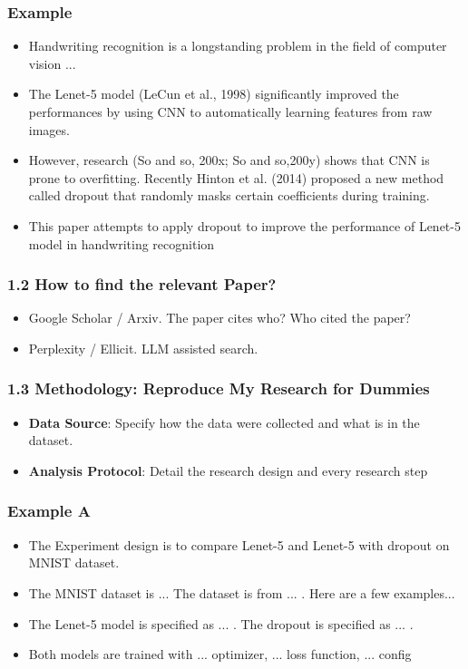 \documentclass{beamer}
\begin{document}
      \begin{frame}
      \frametitle{Example}
      \begin{itemize}[<+->]
          \item Handwriting recognition is a longstanding problem in the field of computer vision ...
          \item The Lenet-5 model (LeCun et al., 1998) significantly improved the performances by using CNN to automatically learning features from raw images.
          \item However, research (So and so, 200x; So and so,200y) shows that CNN is prone to overfitting. Recently Hinton et al. (2014) proposed a new method called dropout that randomly masks certain coefficients during training.
          \item This paper attempts to apply dropout to improve the performance of Lenet-5 model in handwriting recognition
      \end{itemize}
      \end{frame}
  
      \begin{frame}
      \frametitle{1.2 How to find the relevant Paper?}
      \begin{itemize}
          \item Google Scholar / Arxiv. \newline The paper cites who? Who cited the paper?
          \item Perplexity / Ellicit.  \newline LLM assisted search.
      \end{itemize}
      \end{frame}
      
      
      
      \begin{frame}
      \frametitle{1.3 Methodology: Reproduce My Research for Dummies}
      \begin{itemize}
          \item \textbf{Data Source}: Specify how the data were collected and what is in the dataset.
          \item \textbf{Analysis Protocol}: Detail the research design and every research step
      \end{itemize}
      \end{frame}
      
      
      \begin{frame}
          \frametitle{Example A}
          \begin{itemize}[<+->]
              \item The Experiment design is to compare Lenet-5 and Lenet-5 with dropout on MNIST dataset.
              \item The MNIST dataset is ...  The dataset is from ... . Here are a few examples...
              \item The Lenet-5 model is specified as ... . The dropout is specified as ... .
              \item Both models are trained with ... optimizer, ... loss function, ... config
          \end{itemize}
          \end{frame}
          
\end{document}
